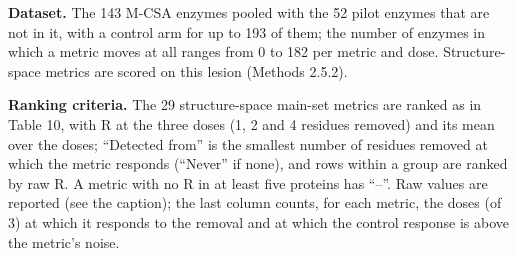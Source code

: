 \documentclass[
  10pt,
]{article}
\DeclareRobustCommand{\_}{\textunderscore\hspace{0pt}}
\begin{document}
\textbf{Dataset.}
The 143 M-CSA
enzymes
\cite{ribeiro2018}
pooled with the 52
pilot enzymes that
are not in it, with
a control arm for up
to 193 of them; the
number of enzymes in
which a metric moves
at all ranges from 0
to 182 per metric
and dose.
Structure-space
metrics are scored
on this lesion
(Methods 2.5.2).

\textbf{Ranking
criteria.} The 29
structure-space
main-set metrics are
ranked as in Table
10, with R at the
three doses (1, 2
and 4 residues
removed) and its
mean over the doses;
``Detected from'' is
the smallest number
of residues removed
at which the metric
responds (``Never''
if none), and rows
within a group are
ranked by raw R. A
metric with no R in
at least five
proteins has ``--''.
Raw values are
reported (see the
caption); the last
column counts, for
each metric, the
doses (of 3) at
which it responds to
the removal and at
which the control
response is above
the metric's noise.
\end{document}
